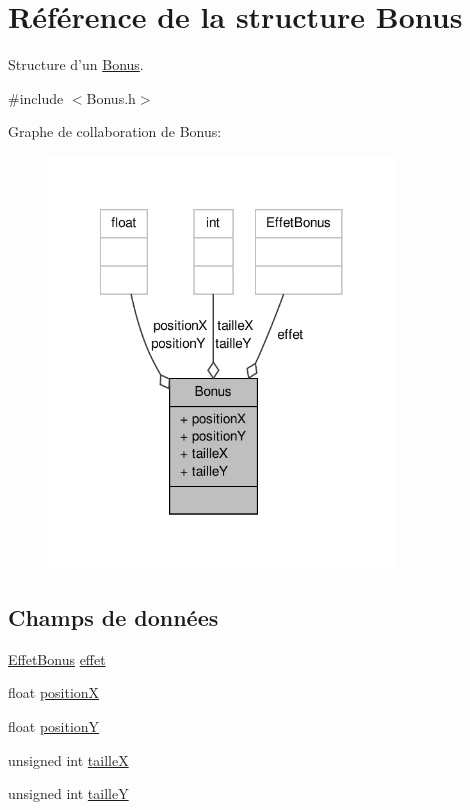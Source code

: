 \hypertarget{structBonus}{\section{Référence de la structure Bonus}
\label{structBonus}
}


Structure d'un \hyperlink{structBonus}{Bonus}.  




{\ttfamily \#include $<$Bonus.\-h$>$}



Graphe de collaboration de Bonus\-:\nopagebreak
\begin{figure}[H]
\begin{center}
\leavevmode
\includegraphics[width=260pt]{structBonus__coll__graph}
\end{center}
\end{figure}
\subsection*{Champs de données}
\begin{DoxyCompactItemize}
\item 
\hyperlink{EffetBonus_8h_a5c3ffd6a343fb8d5f63c87ee1a37a7fe}{Effet\-Bonus} \hyperlink{structBonus_a0619fdbeba9edd702a607887a7f79f62}{effet}
\item 
float \hyperlink{structBonus_a299226996e549498df83b3768d3b43af}{position\-X}
\item 
float \hyperlink{structBonus_aa5cc7fbc0c3fe6b014900c7223a1d6cb}{position\-Y}
\item 
unsigned int \hyperlink{structBonus_aede925340da983fdddf1f901c976e00a}{taille\-X}
\item 
unsigned int \hyperlink{structBonus_ae570700aa309f6de2f91fc84ddb409c2}{taille\-Y}
\end{DoxyCompactItemize}


